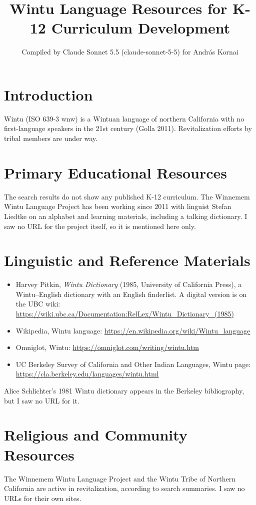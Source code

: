 \documentclass[12pt]{article}
\title{Wintu Language Resources for K-12 Curriculum Development}
\author{Compiled by Claude Sonnet 5.5 (claude-sonnet-5-5) for Andr\'as Kornai}
\date{}
\begin{document}
\maketitle

\section{Introduction}
Wintu (ISO 639-3 wnw) is a Wintuan language of northern California with no first-language speakers in the 21st century (Golla 2011). Revitalization efforts by tribal members are under way.

\section{Primary Educational Resources}
The search results do not show any published K-12 curriculum. The Winnemem Wintu Language Project has been working since 2011 with linguist Stefan Liedtke on an alphabet and learning materials, including a talking dictionary. I saw no URL for the project itself, so it is mentioned here only.

\section{Linguistic and Reference Materials}
\begin{itemize}
\item Harvey Pitkin, \emph{Wintu Dictionary} (1985, University of California Press), a Wintu--English dictionary with an English finderlist. A digital version is on the UBC wiki: \url{https://wiki.ubc.ca/Documentation:RelLex/Wintu_Dictionary_(1985)}
\item Wikipedia, Wintu language: \url{https://en.wikipedia.org/wiki/Wintu_language}
\item Omniglot, Wintu: \url{https://omniglot.com/writing/wintu.htm}
\item UC Berkeley Survey of California and Other Indian Languages, Wintu page: \url{https://cla.berkeley.edu/languages/wintu.html}
\end{itemize}
Alice Schlichter's 1981 Wintu dictionary appears in the Berkeley bibliography, but I saw no URL for it.

\section{Religious and Community Resources}
The Winnemem Wintu Language Project and the Wintu Tribe of Northern California are active in revitalization, according to search summaries. I saw no URLs for their own sites.
\end{document}
